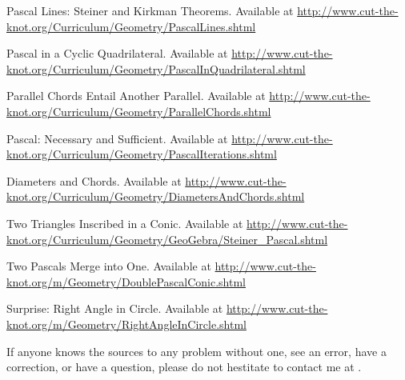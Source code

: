 \documentclass[11pt,paper=letter]{scrartcl}
\begin{document}
\begin{thebibliography}{99}

 Pascal Lines: Steiner and Kirkman Theorems. Available at \url{http://www.cut-the-knot.org/Curriculum/Geometry/PascalLines.shtml}

 Pascal in a Cyclic Quadrilateral. Available at \url{http://www.cut-the-knot.org/Curriculum/Geometry/PascalInQuadrilateral.shtml}

 Parallel Chords Entail Another Parallel. Available at \url{http://www.cut-the-knot.org/Curriculum/Geometry/ParallelChords.shtml}

 Pascal: Necessary and Sufficient. Available at \url{http://www.cut-the-knot.org/Curriculum/Geometry/PascalIterations.shtml}

 Diameters and Chords. Available at \url{http://www.cut-the-knot.org/Curriculum/Geometry/DiametersAndChords.shtml}

 Two Triangles Inscribed in a Conic. Available at \url{http://www.cut-the-knot.org/Curriculum/Geometry/GeoGebra/Steiner_Pascal.shtml}

 Two Pascals Merge into One. Available at \url{http://www.cut-the-knot.org/m/Geometry/DoublePascalConic.shtml}

 Surprise: Right Angle in Circle. Available at \url{http://www.cut-the-knot.org/m/Geometry/RightAngleInCircle.shtml}

\end{thebibliography}

If anyone knows the sources to any problem without one, see an error, have a correction, or have a question, please do not hestitate to contact me at .
\end{document}
